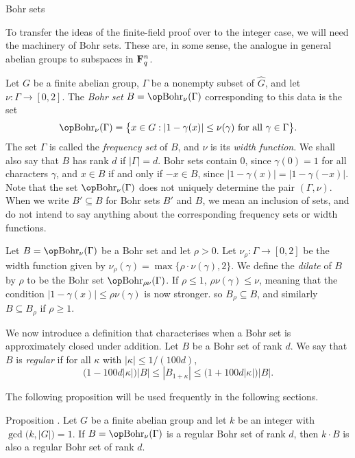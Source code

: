 \advsect Bohr sets

To transfer the ideas of the finite-field proof over to the integer case, we will need the machinery of Bohr
sets. These are, in some sense, the analogue in general abelian groups to subspaces in ${\bf F}_q^n$.

Let $G$ be a finite abelian group, $\Gamma$ be a nonempty subset of $\hat G$, and let $\nu:\Gamma\to [0,2]$.
The {\it Bohr set} $B = \Bohr_\nu(\Gamma)$ corresponding to this data is the set
$$\Bohr_\nu(\Gamma) = \bigl\{x\in G: |1-\gamma(x)| \le \nu(\gamma)\ \hbox{for all}\ \gamma\in \Gamma\bigr\}.$$
The set $\Gamma$ is called the {\it frequency set} of $B$, and $\nu$ is its {\it width function}.
We shall also say that $B$ has rank $d$ if $|\Gamma| = d$.
Bohr sets contain $0$, since $\gamma(0) = 1$ for all characters $\gamma$, and $x\in B$ if and only if $-x\in B$,
since $|1-\gamma(x)| = |1-\gamma(-x)|$.
Note that the set $\Bohr_\nu(\Gamma)$ does not uniquely determine the pair $(\Gamma,\nu)$.
When we write $B'\subseteq B$ for Bohr sets $B'$ and $B$, we mean an inclusion of sets, and do not intend
to say anything about the corresponding frequency sets or width functions.

Let $B = \Bohr_\nu(\Gamma)$ be a Bohr set and let $\rho>0$. Let $\nu_\rho:\Gamma\to[0,2]$ be the width function
given by $\nu_\rho(\gamma) = \max\bigl\{\rho\cdot\nu(\gamma),2\bigr\}$. We define the {\it dilate} of
$B$ by $\rho$
to be the Bohr set $\Bohr_{\rho\nu}(\Gamma)$. If $\rho\le 1$, $\rho \nu(\gamma)\le \nu$, meaning that
the condition $|1-\gamma(x)|\le \rho\nu(\gamma)$ is now stronger. so $B_\rho\subseteq B$, and similarly
$B\subseteq B_\rho$ if $\rho\ge 1$.

We now introduce a definition that characterises when a Bohr set is approximately closed under
addition. Let $B$ be a Bohr set of rank $d$. We say that $B$ is {\it regular} if for all $\kappa$
with $|\kappa|\le 1/(100d)$,
$$\bigl(1-100d|\kappa|\bigr)|B| \le |B_{1+\kappa}| \le \bigl(1+100d|\kappa|\bigr)|B|.$$

The following proposition will be used frequently in the following sections.

\proclaim Proposition \advthm. Let $G$ be a finite abelian group and let $k$ be an integer with
$\gcd\bigl(k,|G|\bigr) = 1$. If $B = \Bohr_\nu(\Gamma)$ is a regular Bohr set of rank $d$, then
$k\cdot B$ is also a regular Bohr set of rank $d$.

